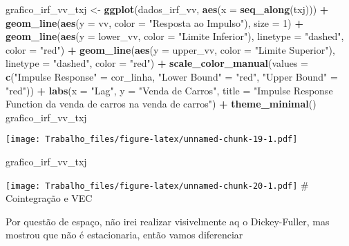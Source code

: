 \documentclass[
]{article}
\newenvironment{Shaded}{\begin{snugshade}}{\end{snugshade}}
\newcommand{\AttributeTok}[1]{\textcolor[rgb]{0.13,0.29,0.53}{#1}}
\newcommand{\DecValTok}[1]{\textcolor[rgb]{0.00,0.00,0.81}{#1}}
\newcommand{\FunctionTok}[1]{\textcolor[rgb]{0.13,0.29,0.53}{\textbf{#1}}}
\newcommand{\NormalTok}[1]{#1}
\newcommand{\OtherTok}[1]{\textcolor[rgb]{0.56,0.35,0.01}{#1}}
\newcommand{\SpecialCharTok}[1]{\textcolor[rgb]{0.81,0.36,0.00}{\textbf{#1}}}
\newcommand{\StringTok}[1]{\textcolor[rgb]{0.31,0.60,0.02}{#1}}
\begin{document}
\begin{Shaded}
\begin{Highlighting}[]
\NormalTok{grafico\_irf\_vv\_txj }\OtherTok{\textless{}{-}} \FunctionTok{ggplot}\NormalTok{(dados\_irf\_vv, }\FunctionTok{aes}\NormalTok{(}\AttributeTok{x =} \FunctionTok{seq\_along}\NormalTok{(txj))) }\SpecialCharTok{+}
  \FunctionTok{geom\_line}\NormalTok{(}\FunctionTok{aes}\NormalTok{(}\AttributeTok{y =}\NormalTok{ vv, }\AttributeTok{color =} \StringTok{"Resposta ao Impulso"}\NormalTok{), }\AttributeTok{size =} \DecValTok{1}\NormalTok{) }\SpecialCharTok{+}
  \FunctionTok{geom\_line}\NormalTok{(}\FunctionTok{aes}\NormalTok{(}\AttributeTok{y =}\NormalTok{ lower\_vv, }\AttributeTok{color =} \StringTok{"Limite Inferior"}\NormalTok{), }\AttributeTok{linetype =} \StringTok{"dashed"}\NormalTok{, }\AttributeTok{color =} \StringTok{"red"}\NormalTok{) }\SpecialCharTok{+}
  \FunctionTok{geom\_line}\NormalTok{(}\FunctionTok{aes}\NormalTok{(}\AttributeTok{y =}\NormalTok{ upper\_vv, }\AttributeTok{color =} \StringTok{"Limite Superior"}\NormalTok{), }\AttributeTok{linetype =} \StringTok{"dashed"}\NormalTok{, }\AttributeTok{color =} \StringTok{"red"}\NormalTok{) }\SpecialCharTok{+}
  \FunctionTok{scale\_color\_manual}\NormalTok{(}\AttributeTok{values =} \FunctionTok{c}\NormalTok{(}\StringTok{"Impulse Response"} \OtherTok{=}\NormalTok{ cor\_linha, }\StringTok{"Lower Bound"} \OtherTok{=} \StringTok{"red"}\NormalTok{, }\StringTok{"Upper Bound"} \OtherTok{=} \StringTok{"red"}\NormalTok{)) }\SpecialCharTok{+}
  \FunctionTok{labs}\NormalTok{(}\AttributeTok{x =} \StringTok{"Lag"}\NormalTok{, }\AttributeTok{y =} \StringTok{"Venda de Carros"}\NormalTok{, }\AttributeTok{title =} \StringTok{"Impulse Response Function da venda de carros na venda de carros"}\NormalTok{) }\SpecialCharTok{+}
  \FunctionTok{theme\_minimal}\NormalTok{()}
\NormalTok{grafico\_irf\_vv\_txj}
\end{Highlighting}
\end{Shaded}

\texttt{[image: Trabalho\_files/figure-latex/unnamed-chunk-19-1.pdf]}

\begin{Shaded}
\begin{Highlighting}[]
\NormalTok{grafico\_irf\_vv\_txj}
\end{Highlighting}
\end{Shaded}

\texttt{[image: Trabalho\_files/figure-latex/unnamed-chunk-20-1.pdf]} \#
Cointegração e VEC

Por questão de espaço, não irei realizar visivelmente aq o
Dickey-Fuller, mas mostrou que não é estacionaria, então vamos
diferenciar
\end{document}
